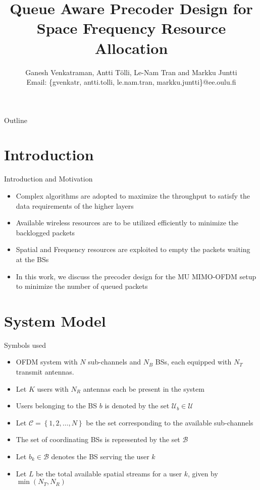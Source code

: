 \documentclass[10pt]{beamer}
\title{Queue Aware Precoder Design for Space Frequency Resource Allocation}
\author{{Ganesh Venkatraman, Antti T\"{o}lli, Le-Nam Tran and Markku Juntti} \\ \scriptsize{Email: \{gvenkatr, antti.tolli, le.nam.tran, markku.juntti\}@ee.oulu.fi}}
\newcommand{\me}[1]{\( #1 \)}
\newcommand{\mc}[1]{\mathcal{#1}}
\newcommand{\set}[1]{\left \lbrace #1 \right \rbrace }
\begin{document}

\begin{frame}
    \titlepage
\end{frame}

\begin{frame}{Outline}
    \tableofcontents
\end{frame}

\section{Introduction}

\begin{frame}{Introduction and Motivation}
\begin{itemize}
\item Complex algorithms are adopted to maximize the throughput to satisfy the data requirements of the higher layers
\item Available wireless resources are to be utilized efficiently to minimize the backlogged packets 
\item Spatial and Frequency resources are exploited to empty the packets waiting at the \acsp{BS}
\item In this work, we discuss the precoder design for the \acl{MU} \acs{MIMO}-\acs{OFDM} setup to minimize the number of queued packets 
\end{itemize}
\end{frame}

\section{System Model}

\begin{frame}{Symbols used}
\begin{itemize}
\item \acs{OFDM} system with \me{N} sub-channels and \me{N_B} \acsp{BS}, each equipped with \me{N_T} transmit antennas.
\item Let \me{K} users with \me{N_R} antennas each be present in the system
\item Users belonging to the \acs{BS} \me{b} is denoted by the set \me{\mc{U}_b \in \mc{U}}
\item Let \me{\mathcal{C} = \set{1,2,\dotsc,N}} be the set corresponding to the available sub-channels
\item The set of coordinating \acsp{BS} is represented by the set \me{\mc{B}}
\item Let \me{b_k \in \mathcal{B}} denotes the \ac{BS} serving the user \me{k}
\item Let \me{L} be the total available spatial streams for a user \me{k}, given by \me{\min (N_T,N_R)}
\end{itemize}
\end{frame}
\end{document}
